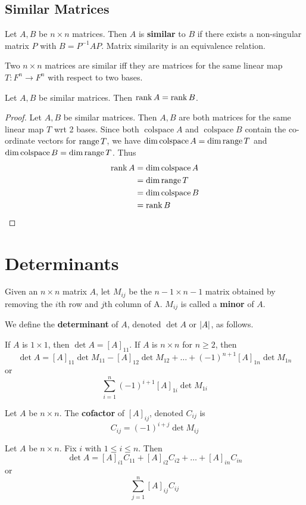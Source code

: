 \documentclass{article}
\DeclareMathOperator{\colspace}{colspace}
\begin{document}
\subsection{Similar Matrices}
\begin{definition}
  Let $A, B$ be $n \times n$ matrices. Then $A$ is \textbf{similar} to $B$ if there exists a non-singular matrix $P$ with $B = P^{-1}AP$.
  Matrix similarity is an equivalence relation.
\end{definition}
\begin{theorem}
  Two $n \times n$ matrices are similar iff they are matrices for the same linear map $T: F^n \to F^n$ with respect to two bases.
\end{theorem}
\begin{theorem}
  Let $A, B$ be similar matrices. Then $\rank A = \rank B$.
\end{theorem}
\begin{proof}
  Let $A, B$ be similar matrices. Then $A, B$ are both matrices for the same linear map $T$ wrt 2 bases. Since both $\colspace A$ and $\colspace B$ contain the co-ordinate vectors for $\operatorname{\text{range}} T$, we have $\dim \colspace A = \dim \range T$ and $\dim \colspace B = \dim \range T$. Thus
  \begin{align*}
    \rank A & = \dim \colspace A \\
            & = \dim \range T    \\
            & = \dim \colspace B \\
            & = \rank B
  \end{align*}
\end{proof}
\section{Determinants}
\begin{definition}
  Given an $n \times n$ matrix $A$, let $M_{ij}$ be the $n - 1 \times n - 1$ matrix obtained by removing the $i$th row and $j$th column of A. $M_{ij}$ is called a \textbf{minor} of $A$.

  We define the \textbf{determinant} of $A$, denoted $\det A$ or $\abs{A}$, as follows.

  If $A$ is $1 \times 1$, then $\det A = [A]_{11}$.
  If $A$ is $n \times n$ for $n \geq 2$, then \[
    \det A = [A]_{11} \det M_{11} - [A]_{12} \det M_{12} + \dots + (-1)^{n+1}[A]_{1n}\det M_{1n}
  \] or \[
    \sum_{i=1}^n (-1)^{i+1}[A]_{1i}\det M_{1i}
  \]
\end{definition}
\begin{definition}
  Let $A$ be $n \times n$. The \textbf{cofactor} of $[A]_{ij}$, denoted $C_{ij}$ is \[
    C_{ij} = (-1)^{i+j} \det M_{ij}
  \]
\end{definition}
\begin{theorem}
  Let $A$ be $n \times n$. Fix $i$ with $1 \leq i \leq n$. Then \[
    \det A = [A]_{i1}C_{11} + [A]_{i2}C_{i2} + \dots + [A]_{in}C_{in}
  \] or \[
    \sum_{j=1}^n [A]_{ij}C_{ij}
  \]
\end{theorem}
\end{document}
